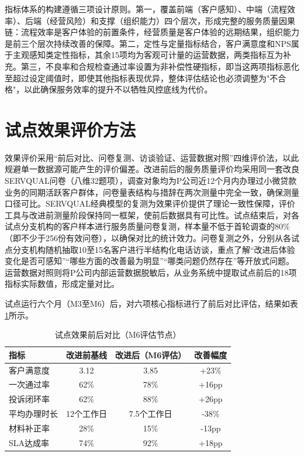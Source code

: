 指标体系的构建遵循三项设计原则。第一，覆盖前端（客户感知）、中端（流程效率）、后端（经营风险）和支撑（组织能力）四个层次，形成完整的服务质量因果链：流程效率是客户体验的前置条件，经营质量是客户体验的远期结果，组织能力是前三个层次持续改善的保障。第二，定性与定量指标结合，客户满意度和NPS属于主观感知类定性指标，其余15项均为客观可计量的运营数据，两类指标互为补充。第三，不良率和合规检查通过率设置为非补偿性硬指标，即当这两项指标恶化至超过设定阈值时，即使其他指标表现优异，整体评估结论也必须调整为"不合格"，以此确保服务效率的提升不以牺牲风控底线为代价。

\section{试点效果评价方法}

效果评价采用“前后对比、问卷复测、访谈验证、运营数据对照”四维评价法，以此规避单一数据源可能产生的评价偏差。改进前后的服务质量评价均采用同一套改良SERVQUAL问卷（八维32题项），调查对象均为P公司近12个月内办理过小微贷款业务的同期活跃客户群体，问卷量表结构与措辞在两次测量中完全一致，确保测量口径可比。SERVQUAL经典模型的复测为效果评价提供了理论一致性保障，评价工具与改进前测量阶段保持同一框架，使前后数据具有可比性\cite{ref14}。试点结束后，对各试点分支机构的客户样本进行服务质量问卷复测，样本量不低于首轮调查的80\%（即不少于256份有效问卷），以确保对比的统计效力。问卷复测之外，分别从各试点分支机构随机抽取10至15名客户进行半结构化电话访谈，重点了解“改进后体验变化是否可感知”“哪些方面的改善最为明显”“哪类问题仍然存在”等开放式问题。运营数据对照则将P公司内部运营数据脱敏后，从业务系统中提取试点前后的18项指标实际数值，形成定量对比。

试点运行六个月（M3至M6）后，对六项核心指标进行了前后对比评估，结果如表\ref{tab:6-4}所示。

\begin{table}[htbp]
  \centering
  \small
  \caption[试点效果前后对比]{试点效果前后对比（M6评估节点）}
  \label{tab:6-4}
  \begin{tabularx}{\textwidth}{X c c c}
    \toprule
    \textbf{指标} & \textbf{改进前基线} & \textbf{改进后（M6评估）} & \textbf{改善幅度} \\
    \midrule
    客户满意度 & 3.12 & 3.85 & +23\% \\
    一次通过率 & 62\% & 78\% & +16pp \\
    投诉闭环率 & 62\% & 88\% & +26pp \\
    平均办理时长 & 12个工作日 & 7.5个工作日 & -38\% \\
    材料补正率 & 28\% & 15\% & -13pp \\
    SLA达成率 & 74\% & 92\% & +18pp \\
    \bottomrule
  \end{tabularx}
\end{table}

